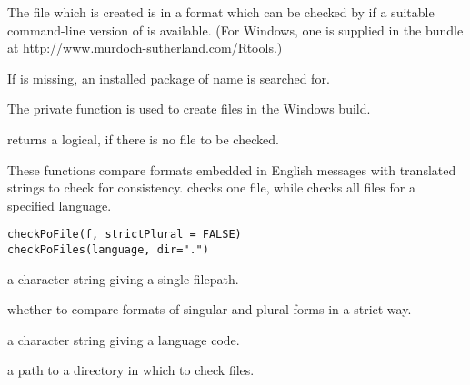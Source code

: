 %
\begin{Details}\relax
The file  which is created is in a format which can be
checked by  if a suitable command-line version
of  is available.  (For Windows, one is supplied in
the bundle at \url{http://www.murdoch-sutherland.com/Rtools}.)

If  is missing, an installed package of name 
is searched for.

The private function  is used to create
 files in the Windows build.
\end{Details}
%
\begin{Value}
 returns a logical,  if there is no
 file to be checked.
\end{Value}
%
\begin{SeeAlso}\relax
{}
\end{SeeAlso}
%
\begin{Description}\relax
These functions compare formats embedded in English messages
with translated strings to check for consistency.  
checks one file, while  checks all files for a specified
language.
\end{Description}
%
\begin{Usage}
\begin{verbatim}
checkPoFile(f, strictPlural = FALSE)
checkPoFiles(language, dir=".")
\end{verbatim}
\end{Usage}
%
\begin{Arguments}
\begin{ldescription}
\item[\code{f}] a character string giving a single filepath.
\item[\code{strictPlural}] whether to compare formats of singular and plural
forms in a strict way.
\item[\code{language}] a character string giving a language code.
\item[\code{dir}] a path to a directory in which to check files.
\end{ldescription}
\end{Arguments}
%
